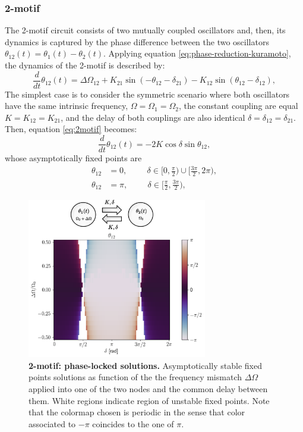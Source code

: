 \documentclass[../main.tex]{subfiles}
\begin{document}
\subsubsection{2-motif}
The 2-motif circuit consists of two mutually coupled oscillators and, then, its dynamics is captured by the phase difference between the two oscillators $\theta_{12}(t) = \theta_1(t)-\theta_2(t)$.
Applying equation \eqref{eq:phase-reduction-kuramoto}, the dynamics of the 2-motif is described by:
\begin{equation}
    \displaystyle\frac{d}{dt}{\theta}_{12}(t) = \Delta\Omega_{12} + K_{21}\sin(-\theta_{12}-\delta_{21}) - K_{12}\sin(\theta_{12}-\delta_{12}), 
    \label{eq:2motif}
\end{equation}
The simplest case is to consider the symmetric scenario where both oscillators have the same intrinsic frequency, $\Omega = \Omega_1 = \Omega_2$, the constant coupling are equal $K=K_{12}=K_{21}$, and the delay of both couplings are also identical $\delta = \delta_{12}=\delta_{21}$.
Then, equation \eqref{eq:2motif} becomes:
\begin{equation}
    \displaystyle\frac{d}{dt}{\theta}_{12}(t) = -2K\cos\delta\sin\theta_{12},
    \label{eq:2motif-symmetric}
\end{equation}
whose asymptotically fixed points are 
\begin{equation}
    \begin{aligned}
        \theta_{12} &= 0, \hspace{1cm}\delta\in\bigg[0,\displaystyle\frac{\pi}{2}\bigg) \cup\bigg[\displaystyle\frac{3\pi}{2},2\pi\bigg), \\
        \theta_{12} &= \pi, \hspace{1cm} \delta\in \bigg[\displaystyle\frac{\pi}{2},\displaystyle\frac{3\pi}{2}\bigg),
    \end{aligned}
\end{equation}
\begin{figure}[!htb]
\centering
\includegraphics[width=0.7\textwidth]{chapter2/figures/2motif_different_omega_edited.png}
    \caption{\textbf{2-motif: phase-locked solutions.} Asymptotically stable fixed points solutions as function of the the frequency mismatch $\Delta\Omega$ applied into one of the two nodes and the common delay between them. White regions indicate region of unstable fixed points. Note that the colormap chosen is periodic in the sense that color associated to $-\pi$ coincides to the one of $\pi$.}
    \label{fig:2motif-syncrhonization}
\end{figure}
\end{document}
